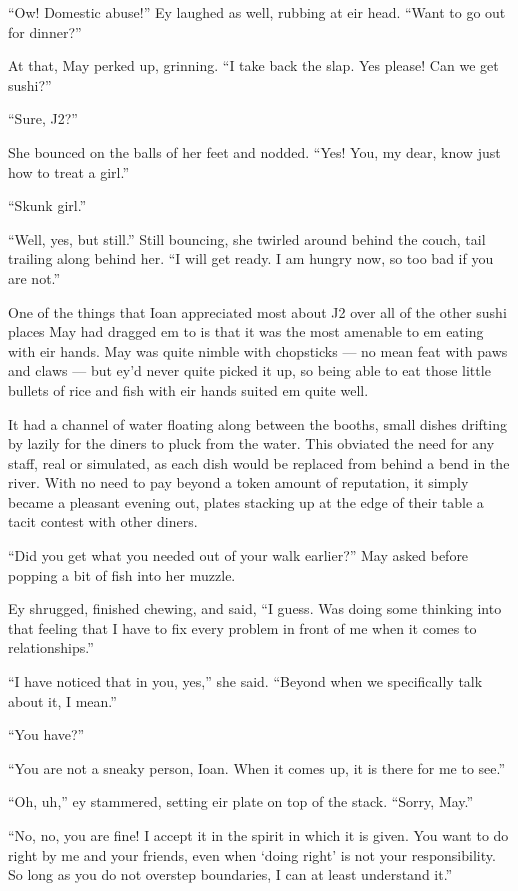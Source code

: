 ``Ow! Domestic abuse!'' Ey laughed as well, rubbing at eir head. ``Want to go out for dinner?''

At that, May perked up, grinning. ``I take back the slap. Yes please! Can we get sushi?''

``Sure, J2?''

She bounced on the balls of her feet and nodded. ``Yes! You, my dear, know just how to treat a girl.''

``Skunk girl.''

``Well, yes, but still.'' Still bouncing, she twirled around behind the couch, tail trailing along behind her. ``I will get ready. I am hungry now, so too bad if you are not.''

One of the things that Ioan appreciated most about J2 over all of the other sushi places May had dragged em to is that it was the most amenable to em eating with eir hands. May was quite nimble with chopsticks — no mean feat with paws and claws — but ey'd never quite picked it up, so being able to eat those little bullets of rice and fish with eir hands suited em quite well.

It had a channel of water floating along between the booths, small dishes drifting by lazily for the diners to pluck from the water. This obviated the need for any staff, real or simulated, as each dish would be replaced from behind a bend in the river. With no need to pay beyond a token amount of reputation, it simply became a pleasant evening out, plates stacking up at the edge of their table a tacit contest with other diners.

``Did you get what you needed out of your walk earlier?'' May asked before popping a bit of fish into her muzzle.

Ey shrugged, finished chewing, and said, ``I guess. Was doing some thinking into that feeling that I have to fix every problem in front of me when it comes to relationships.''

``I have noticed that in you, yes,'' she said. ``Beyond when we specifically talk about it, I mean.''

``You have?''

``You are not a sneaky person, Ioan. When it comes up, it is there for me to see.''

``Oh, uh,'' ey stammered, setting eir plate on top of the stack. ``Sorry, May.''

``No, no, you are fine! I accept it in the spirit in which it is given. You want to do right by me and your friends, even when `doing right' is not your responsibility. So long as you do not overstep boundaries, I can at least understand it.''

